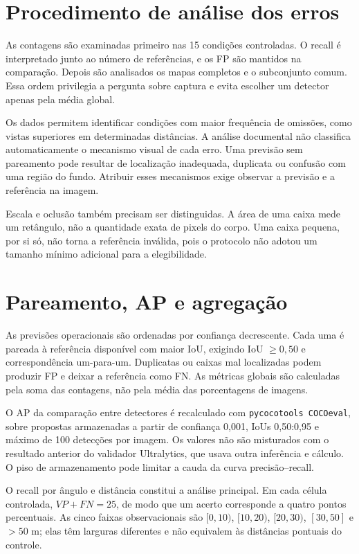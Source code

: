 \section{Procedimento de análise dos erros}
As contagens são examinadas primeiro nas 15 condições controladas. O recall é interpretado junto ao número de referências, e os FP são mantidos na comparação. Depois são analisados os mapas completos e o subconjunto comum. Essa ordem privilegia a pergunta sobre captura e evita escolher um detector apenas pela média global.

Os dados permitem identificar condições com maior frequência de omissões, como vistas superiores em determinadas distâncias. A análise documental não classifica automaticamente o mecanismo visual de cada erro. Uma previsão sem pareamento pode resultar de localização inadequada, duplicata ou confusão com uma região do fundo. Atribuir esses mecanismos exige observar a previsão e a referência na imagem.

Escala e oclusão também precisam ser distinguidas. A área de uma caixa mede um retângulo, não a quantidade exata de pixels do corpo. Uma caixa pequena, por si só, não torna a referência inválida, pois o protocolo não adotou um tamanho mínimo adicional para a elegibilidade.

\section{Pareamento, AP e agregação}
As previsões operacionais são ordenadas por confiança decrescente. Cada uma é pareada à referência disponível com maior IoU, exigindo IoU $\geq0,50$ e correspondência um-para-um. Duplicatas ou caixas mal localizadas podem produzir FP e deixar a referência como FN. As métricas globais são calculadas pela soma das contagens, não pela média das porcentagens de imagens.

O AP da comparação entre detectores é recalculado com \texttt{pycocotools COCOeval}, sobre propostas armazenadas a partir de confiança 0,001, IoUs 0,50:0,95 e máximo de 100 detecções por imagem. Os valores não são misturados com o resultado anterior do validador Ultralytics, que usava outra inferência e cálculo. O piso de armazenamento pode limitar a cauda da curva precisão--recall.

O recall por ângulo e distância constitui a análise principal. Em cada célula controlada, $VP+FN=25$, de modo que um acerto corresponde a quatro pontos percentuais. As cinco faixas observacionais são $[0,10)$, $[10,20)$, $[20,30)$, $[30,50]$ e $>50$ m; elas têm larguras diferentes e não equivalem às distâncias pontuais do controle.

